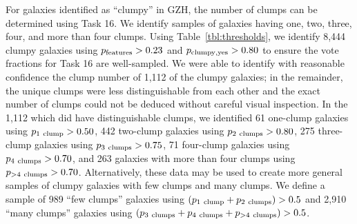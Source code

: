 \documentclass[twocolumn]{aastex6}
\begin{document}
For galaxies identified as ``clumpy'' in GZH, the number of clumps can be determined using Task 16. We identify samples of galaxies having one, two, three, four, and more than four clumps. Using Table~\ref{tbl:thresholds}, we identify 8,444 clumpy galaxies using $p_{\rm features} > 0.23$ and $p_{\rm clumpy,yes}>0.80$ to ensure the vote fractions for Task 16 are well-sampled. We were able to identify with reasonable confidence the clump number of 1,112 of the clumpy galaxies; in the remainder, the unique clumps were less distinguishable from each other and the exact number of clumps could not be deduced without careful visual inspection. In the 1,112 which did have distinguishable clumps, we identified 61 one-clump galaxies using $p_{\rm 1~clump}>0.50$, 442 two-clump galaxies using $p_{\rm 2~clumps}>0.80$, 275 three-clump galaxies using $p_{\rm 3~clumps}>0.75$, 71 four-clump galaxies using $p_{\rm 4~clumps} > 0.70$, and 263 galaxies with more than four clumps using $p_{\rm >4~clumps}>0.70$. Alternatively, these data may be used to create more general samples of clumpy galaxies with few clumps and many clumps. We define a sample of 989 ``few clumps'' galaxies using $(p_{\rm 1~clump} + p_{\rm 2~clumps}) > 0.5$ and 2,910 ``many clumps'' galaxies using $(p_{\rm 3~clumps}+p_{\rm 4~clumps}+p_{\rm >4~clumps})>0.5$.
\end{document}
